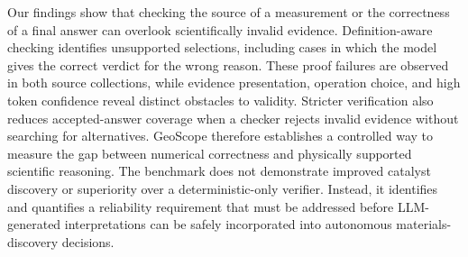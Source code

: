 Our findings show that checking the source of a measurement or the correctness of a final answer can overlook scientifically invalid evidence. Definition-aware checking identifies unsupported selections, including cases in which the model gives the correct verdict for the wrong reason. These proof failures are observed in both source collections, while evidence presentation, operation choice, and high token confidence reveal distinct obstacles to validity. Stricter verification also reduces accepted-answer coverage when a checker rejects invalid evidence without searching for alternatives. GeoScope therefore establishes a controlled way to measure the gap between numerical correctness and physically supported scientific reasoning. The benchmark does not demonstrate improved catalyst discovery or superiority over a deterministic-only verifier. Instead, it identifies and quantifies a reliability requirement that must be addressed before LLM-generated interpretations can be safely incorporated into autonomous materials-discovery decisions.
